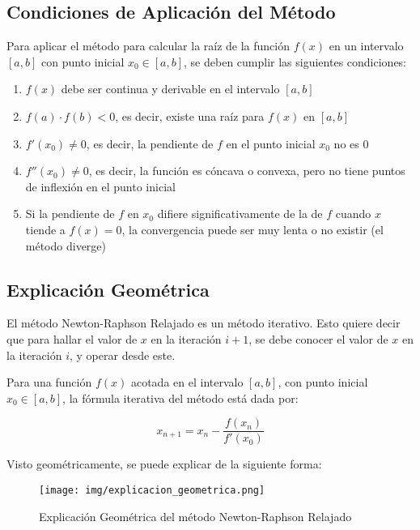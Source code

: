 \documentclass[a4paper,12pt]{article}
\begin{document}
\subsection{Condiciones de Aplicación del Método}

Para aplicar el método para calcular la raíz de la función $f(x)$ en un intervalo $[a,b]$ con punto inicial $x_0 \in [a,b]$, se deben cumplir las siguientes condiciones:

\begin{enumerate}
    \item $f(x)$ debe ser continua y derivable en el intervalo $[a,b]$
    \item $f(a) \cdotp f(b) < 0$, es decir, existe una raíz para $f(x)$ en $[a,b]$
    \item $f'(x_0) \ne 0$, es decir, la pendiente de $f$ en el punto inicial $x_0$ no es 0
    \item $f''(x_0) \ne 0$, es decir, la función es cóncava o convexa, pero no tiene puntos de inflexión en el punto inicial
    \item Si la pendiente de $f$ en $x_0$ difiere significativamente de la de $f$ cuando $x$ tiende a $f(x)=0$, la convergencia puede ser muy lenta o no existir (el método diverge) 
\end{enumerate}

\newpage

\subsection{Explicación Geométrica}

El método Newton-Raphson Relajado es un método iterativo. Esto quiere decir que para hallar el valor de $x$ en la iteración $i+1$, se debe conocer el valor de $x$ en la iteración $i$, y operar desde este. \par

Para una función $f(x)$ acotada en el intervalo $[a,b]$, con punto inicial $x_0 \in [a,b]$, la fórmula iterativa del método está dada por: \par

\[ x_{n+1} = x_n - \frac{f(x_n)}{f'(x_0)} \]

Visto geométricamente, se puede explicar de la siguiente forma:

\vspace{-1em}
\begin{figure}[h!]
\centering
\texttt{[image: img/explicacion\_geometrica.png]}
\vspace{-1em}
\caption{Explicación Geométrica del método Newton-Raphson Relajado}
\label{fig:exp_geom_nrr}
\end{figure}
\end{document}
